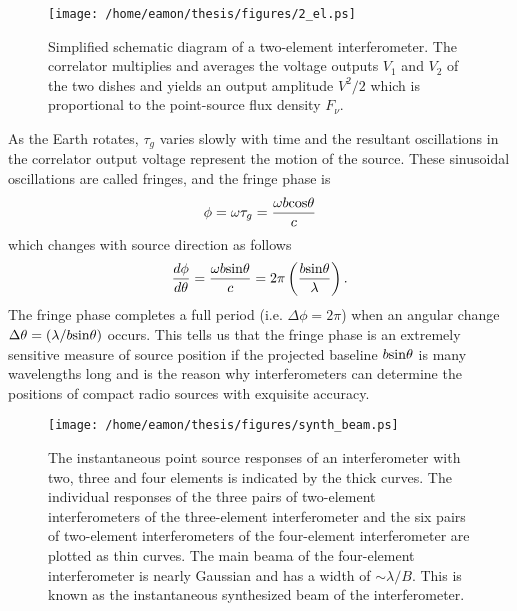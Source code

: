 \begin{figure}[hbt!]
\centering 
          \texttt{[image: /home/eamon/thesis/figures/2\_el.ps]}
\caption[Simplified schematic diagram of a two-element interferometer.]{Simplified schematic diagram of a two-element interferometer. The correlator multiplies and averages the voltage outputs $V_1$ and $V_2$ of the two dishes and yields an output amplitude $V^2/2$ which is proportional to the point-source flux density $F_{\nu}$.}
\label{fig2g}
\end{figure}

As the Earth rotates, $\tau _g$ varies slowly with time and the resultant oscillations in the correlator output voltage represent the motion of the source. These sinusoidal oscillations are called fringes, and the fringe phase is 
\begin{equation}
\phi = \omega \tau _g = \frac{\omega b\rm{cos} \theta}{c}
\end{equation}
which changes with source direction as follows
\begin{equation}
\frac{d\phi}{d\theta}= \frac{\omega b\rm{sin} \theta}{c}=2\pi\left(\frac{b\rm{sin}\theta}{\lambda}\right).
\end{equation}
The fringe phase completes a full period (i.e. $\Delta \phi=2\pi$) when an angular change $\Delta \theta=(\lambda/b\rm{sin}\theta)$ occurs. This tells us that the fringe phase is an extremely sensitive measure of source position if the projected baseline $b\rm{sin}\theta$ is many wavelengths long and is the reason why interferometers can determine the positions of compact radio sources with exquisite accuracy.

\begin{figure}[hbt!]
\centering 
          \texttt{[image: /home/eamon/thesis/figures/synth\_beam.ps]}
\caption[The instantaneous point source responses of an interferometer.]{The instantaneous point source responses of an interferometer with two, three and four elements is indicated by the thick curves. The individual responses of the three pairs of two-element interferometers of the three-element interferometer and the six pairs of two-element interferometers of the four-element interferometer are plotted as thin curves. The main beama of the four-element interferometer is nearly Gaussian and has a width of $\sim \lambda /B$. This is known as the instantaneous synthesized beam of the interferometer.}
\label{fig2h}
\end{figure}

